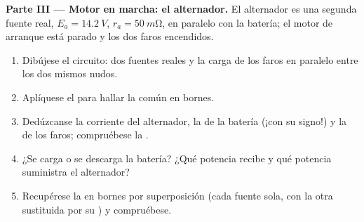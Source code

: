 \begin{problem}
\medskip
\noindent\textbf{Parte III --- Motor en marcha: el alternador.}
El alternador es una segunda fuente real, $E_a = \qty{14.2}{V}$,
$r_a = \qty{50}{m\ohm}$, en paralelo con la batería; el motor de arranque
está parado y los dos faros encendidos.
\begin{enumerate}[resume]
  \item Dibújese el circuito: dos fuentes reales y la carga de los faros
        en paralelo entre los dos mismos nudos.
  \item Aplíquese el  para hallar la  común en
        bornes.
  \item Dedúzcanse la corriente del alternador, la de la batería (¡con su
        signo!) y la de los faros; compruébese la .
  \item ¿Se carga o se descarga la batería? ¿Qué potencia recibe y qué
        potencia suministra el alternador?
  \item Recupérese la  en bornes por superposición (cada fuente
        sola, con la otra sustituida por su ) y
        compruébese.
\end{enumerate}


\end{problem}

